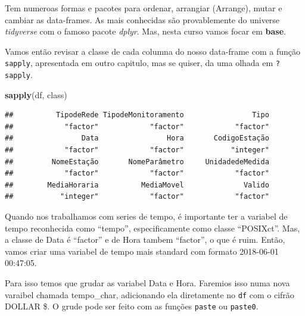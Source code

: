 \documentclass[]{book}
\newenvironment{Shaded}{\begin{snugshade}}{\end{snugshade}}
\newcommand{\KeywordTok}[1]{\textcolor[rgb]{0.13,0.29,0.53}{\textbf{#1}}}
\newcommand{\StringTok}[1]{\textcolor[rgb]{0.31,0.60,0.02}{#1}}
\newcommand{\OperatorTok}[1]{\textcolor[rgb]{0.81,0.36,0.00}{\textbf{#1}}}
\newcommand{\NormalTok}[1]{#1}
\theoremstyle{definition}
\theoremstyle{definition}
\theoremstyle{definition}
\theoremstyle{remark}
\begin{document}
Tem numeroas formas e pacotes para ordenar, arrangiar (Arrange), mutar e
cambiar as data-frames. As mais conhecidas são provablemente do universe
\emph{tidyverse} com o famoso pacote \emph{dplyr}. Mas, nesta curso
vamos focar em \textbf{base}.

Vamos então revisar a classe de cada columna do nosso data-frame com a
função \texttt{sapply}, apresentada em outro capitulo, mas se quiser, da
uma olhada em \texttt{?sapply}.

\begin{Shaded}
\begin{Highlighting}[]
\KeywordTok{sapply}\NormalTok{(df, class)}
\end{Highlighting}
\end{Shaded}

\begin{verbatim}
##          TipodeRede TipodeMonitoramento                Tipo 
##            "factor"            "factor"            "factor" 
##                Data                Hora       CodigoEstação 
##            "factor"            "factor"           "integer" 
##         NomeEstação       NomeParâmetro     UnidadedeMedida 
##            "factor"            "factor"            "factor" 
##        MediaHoraria          MediaMovel              Valido 
##           "integer"            "factor"            "factor"
\end{verbatim}

Quando nos trabalhamos com series de tempo, é importante ter a variabel
de tempo reconhecida como ``tempo'', especificamente como classe
``POSIXct''. Mas, a classe de Data é ``factor'' e de Hora tambem
``factor'', o que é ruim. Então, vamos criar uma variabel de tempo mais
standard com formato 2018-06-01 00:47:05.

Para isso temos que grudar as variabel Data e Hora. Faremios isso numa
nova varaibel chamada tempo\_char, adicionando ela diretamente no
\texttt{df} com o cifrão DOLLAR \$. O grude pode ser feito com as
funções \texttt{paste} ou \texttt{paste0}.

\begin{Shaded}
\end{Shaded}
\end{document}
